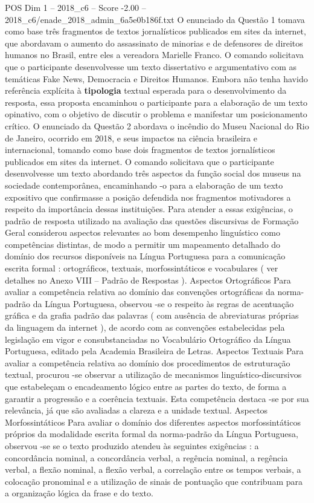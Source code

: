\begin{textsample}{POS Dim 1 – 2018\_c6 – Score -2.00 – 2018\_c6/enade\_2018\_admin\_6a5e0b186f.txt}
O enunciado da Questão 1 tomava como base três fragmentos de textos jornalísticos publicados em sites da internet, que abordavam o aumento do assassinato de minorias e de defensores de direitos humanos no Brasil, entre eles a vereadora Marielle Franco.
O comando solicitava que o participante desenvolvesse um texto dissertativo e argumentativo com as temáticas Fake News, Democracia e Direitos Humanos.
Embora não tenha havido referência explícita à \textbf{tipologia} textual esperada para o desenvolvimento da resposta, essa proposta encaminhou o participante para a elaboração de um texto opinativo, com o objetivo de discutir o problema e manifestar um posicionamento crítico.
O enunciado da Questão 2 abordava o incêndio do Museu Nacional do Rio de Janeiro, ocorrido em 2018, e seus impactos na ciência brasileira e internacional, tomando como base dois fragmentos de textos jornalísticos publicados em sites da internet.
O comando solicitava que o participante desenvolvesse um texto abordando três aspectos da função social dos museus na sociedade contemporânea, encaminhando -o para a elaboração de um texto expositivo que confirmasse a posição defendida nos fragmentos motivadores a respeito da importância dessas instituições.
Para atender a essas exigências, o padrão de resposta utilizado na avaliação das questões discursivas de Formação Geral considerou aspectos relevantes ao bom desempenho linguístico como competências distintas, de modo a permitir um mapeamento detalhado do domínio dos recursos disponíveis na Língua Portuguesa para a comunicação escrita formal : ortográficos, textuais, morfossintáticos e vocabulares ( ver detalhes no Anexo VIII – Padrão de Respostas ).
Aspectos Ortográficos Para avaliar a competência relativa ao domínio das convenções ortográficas da norma-padrão da Língua Portuguesa, observou -se o respeito às regras de acentuação gráfica e da grafia padrão das palavras ( com ausência de abreviaturas próprias da linguagem da internet ), de acordo com as convenções estabelecidas pela legislação em vigor e consubstanciadas no Vocabulário Ortográfico da Língua Portuguesa, editado pela Academia Brasileira de Letras.
Aspectos Textuais Para avaliar a competência relativa ao domínio dos procedimentos de estruturação textual, procurou -se observar a utilização de mecanismos linguístico-discursivos que estabeleçam o encadeamento lógico entre as partes do texto, de forma a garantir a progressão e a coerência textuais.
Esta competência destaca -se por sua relevância, já que são avaliadas a clareza e a unidade textual.
Aspectos Morfossintáticos Para avaliar o domínio dos diferentes aspectos morfossintáticos próprios da modalidade escrita formal da norma-padrão da Língua Portuguesa, observou -se se o texto produzido atendeu às seguintes exigências : a concordância nominal, a concordância verbal, a regência nominal, a regência verbal, a flexão nominal, a flexão verbal, a correlação entre os tempos verbais, a colocação pronominal e a utilização de sinais de pontuação que contribuam para a organização lógica da frase e do texto.

\end{textsample}
